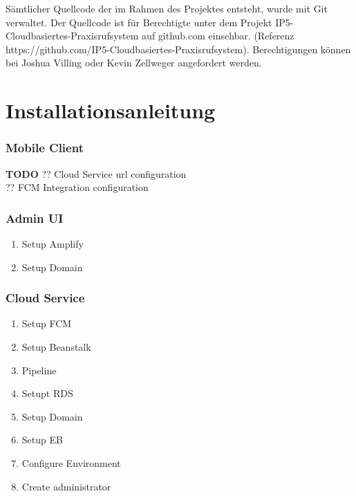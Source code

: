 Sämtlicher Quellcode der im Rahmen des Projektes entsteht, wurde mit Git verwaltet. Der Quellcode ist für Berechtigte unter dem Projekt IP5-Cloudbasiertes-Praxisrufsystem auf github.com einsehbar.
(Referenz https://github.com/IP5-Cloudbasiertes-Praxisrufsystem). Berechtigungen können bei Joshua Villing oder Kevin Zellweger angefordert werden.




\section{Installationsanleitung}

\subsubsection*{Mobile Client}
\textbf{TODO}
?? Cloud Service url configuration \\
?? FCM Integration configuration \\

\subsubsection*{Admin UI}
\begin{enumerate}
    \item Setup Amplify
    \item Setup Domain
\end{enumerate}

\subsubsection*{Cloud Service}

\begin{enumerate}
    \item Setup FCM
    \item Setup Beanstalk
    \item Pipeline
    \item Setupt RDS
    \item Setup Domain
    \item Setup EB
    \item Configure Environment
    \item Create administrator
\end{enumerate}

\clearpage



